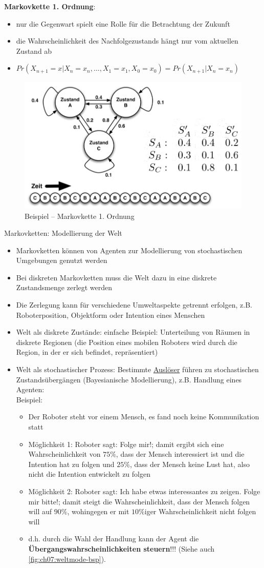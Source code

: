 \textbf{Markovkette 1. Ordnung}:
\begin{itemize}
\item nur die Gegenwart spielt eine Rolle f\"ur die Betrachtung der Zukunft
\item die Wahrscheinlichkeit des Nachfolgezustands h\"angt nur vom aktuellen Zustand ab
\item $Pr(X_{n+1} = x | X_n = x_n, \ldots, X_1 = x_1, X_0 = x_0) = Pr(X_{n+1}|X_n = x_n)$
\end{itemize}
\begin{figure}
	\centering
  	\includegraphics[width=0.5\linewidth]{figures/ch07_mk-bsp.png}
	\caption{Beispiel -- Markovkette 1. Ordnung}
	\label{fig:ch07:mk-bsp}
\end{figure}
Markovketten: Modellierung der Welt
\begin{itemize}
	\item Markovketten k\"onnen von Agenten zur Modellierung von stochastischen Umgebungen genutzt werden
	\item Bei diskreten Markovketten muss die Welt dazu in eine diskrete Zustandsmenge zerlegt werden
	\item Die Zerlegung kann f\"ur verschiedene Umweltaspekte getrennt erfolgen, z.B. Roboterposition, Objektform oder Intention eines Menschen
	\item Welt als diskrete Zust\"ande: einfache Beispiel: Unterteilung von R\"aumen in diskrete Regionen (die Position eines mobilen Roboters wird durch die Region, in der er sich befindet, repr\"asentiert)
	\item Welt als stochastischer Prozess: Bestimmte \underline{Ausl\"oser} f\"uhren zu stochastischen Zustands\"uberg\"angen (Bayesianische Modellierung), z.B. Handlung eines Agenten:\\ Beispiel:
	\begin{itemize}
		\item Der Roboter steht vor einem Mensch, es fand noch keine Kommunikation statt
		\item M\"oglichkeit 1: Roboter sagt: Folge mir!; damit ergibt sich eine Wahrscheinlichkeit von $75\%$, dass der Mensch interessiert ist und die Intention hat zu folgen und $25\%$, dass der Mensch keine Lust hat, also nicht die Intention entwickelt zu folgen
		\item M\"oglichkeit 2: Roboter sagt: Ich habe etwas interessantes zu zeigen. Folge mir bitte!; damit steigt die Wahrscheinlichkeit, dass der Mensch folgen will auf $90\%$, wohingegen er mit $10\%$iger Wahrscheinlichkeit nicht folgen will
		\item d.h. durch die Wahl der Handlung kann der Agent die \textbf{\"Ubergangswahrscheinlichkeiten steuern}!!! (Siehe auch \autoref{fig:ch07:weltmode-bsp}).
	\end{itemize}
\end{itemize}
